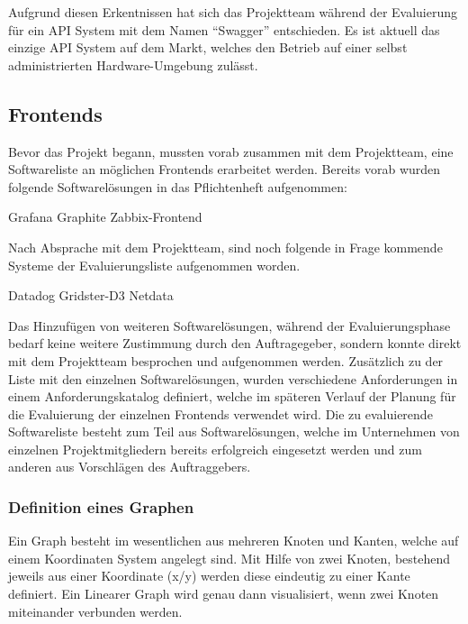 Aufgrund diesen Erkentnissen hat sich das Projektteam während der Evaluierung
für ein API System mit dem Namen ``Swagger'' entschieden. Es ist aktuell das
einzige API System auf dem Markt, welches den Betrieb auf einer selbst
administrierten Hardware-Umgebung zulässt.
\nl%

\subsection{Frontends}
\label{subsec:frontends}
Bevor das Projekt begann, mussten vorab zusammen mit dem Projektteam, eine
Softwareliste an möglichen Frontends erarbeitet werden. Bereits vorab wurden
folgende Softwarelösungen in das Pflichtenheft aufgenommen:

\begin{outline}
  \1 Grafana
  \1 Graphite
  \1 Zabbix-Frontend
\end{outline}

Nach Absprache mit dem Projektteam, sind noch folgende in Frage kommende
Systeme der Evaluierungsliste aufgenommen worden.

\begin{outline}
  \1 Datadog
  \1 Gridster-D3
  \1 Netdata
\end{outline}

Das Hinzufügen von weiteren Softwarelösungen, während der Evaluierungsphase
bedarf keine weitere Zustimmung durch den Auftragegeber, sondern konnte direkt
mit dem Projektteam besprochen und aufgenommen werden. Zusätzlich zu der Liste
mit den einzelnen Softwarelösungen, wurden verschiedene Anforderungen in einem
Anforderungskatalog definiert, welche im späteren Verlauf der Planung für die
Evaluierung der einzelnen Frontends verwendet wird. Die zu evaluierende
Softwareliste besteht zum Teil aus Softwarelösungen, welche im Unternehmen von
einzelnen Projektmitgliedern bereits erfolgreich eingesetzt werden und zum
anderen aus Vorschlägen des Auftraggebers.
\mr%

\subsubsection{Definition eines Graphen}
\label{definition_eines_graphen}
Ein Graph besteht im wesentlichen aus mehreren Knoten und Kanten, welche auf
einem Koordinaten System angelegt sind. Mit Hilfe von zwei Knoten, bestehend
jeweils aus einer Koordinate (x/y) werden diese eindeutig zu einer Kante
definiert. Ein Linearer Graph wird genau dann visualisiert, wenn zwei Knoten
miteinander verbunden werden.

